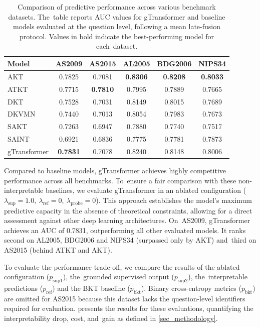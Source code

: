 \documentclass[applsci,article,accept,moreauthors,pdftex]{Definitions/mdpi}
\begin{document}
\begin{table}[H]
\centering
\caption{Comparison of predictive performance across various benchmark datasets. The~table reports AUC values for gTransformer and baseline models evaluated at the question level, following a mean late-fusion protocol. Values in bold indicate the best-performing model for each~dataset. \label{tab_performance}}
\begin{tabularx}{\textwidth}{LcCcCc}
\toprule
\textbf{Model} & \textbf{AS2009} & \textbf{AS2015} & \textbf{AL2005} & \textbf{BDG2006} & \textbf{NIPS34} \\
\midrule
AKT & 0.7825 & 0.7081 & \textbf{0.8306} & \textbf{0.8208} & \textbf{0.8033} \\
ATKT & 0.7715 & \textbf{0.7810} & 0.7995 & 0.7889 & 0.7665 \\
DKT & 0.7528 & 0.7031 & 0.8149 & 0.8015 & 0.7689 \\
DKVMN & 0.7440 & 0.7013 & 0.8054 & 0.7983 & 0.7673 \\
SAKT & 0.7263 & 0.6947 & 0.7880 & 0.7740 & 0.7517 \\
SAINT & 0.6921 & 0.6836 & 0.7775 & 0.7781 & 0.7873 \\
\midrule
gTransformer & \textbf{0.7831} & 0.7078 & 0.8240 & 0.8148 & 0.8006 \\
\bottomrule
\end{tabularx}

\end{table}

Compared to baseline models, gTransformer achieves highly competitive performance across all benchmarks. To~ensure a fair comparison with these non-interpretable baselines, we evaluate gTransformer in an ablated configuration ($\lambda_{\text{sup}} = 1.0,~\lambda_{\text{ref}} = 0,~\lambda_{\text{probe}} = 0$). This approach establishes the model's maximum predictive capacity in the absence of theoretical constraints, allowing for a direct assessment against other deep learning architectures. On~AS2009, gTransformer achieves an AUC of 0.7831, outperforming all other evaluated models. It ranks second on AL2005, BDG2006 and NIPS34 (surpassed only by AKT) and~third on AS2015 (behind ATKT and AKT). 

To evaluate the performance trade-off, we compare the results of the ablated configuration ($p_{\text{sup}1}$), the~grounded supervised output ($p_{\text{sup}2}$), the~interpretable predictions ($p_{\text{ref}}$) and the BKT baseline ($p_{\text{bkt}}$). Binary cross-entropy metrics ($p_{\text{bkt}}$) are omitted for AS2015 because this dataset lacks the question-level identifiers required for evaluation.  presents the results for these evaluations, quantifying the interpretability drop, cost, and~gain as defined in \cref{sec_methodology}. 
\end{document}
